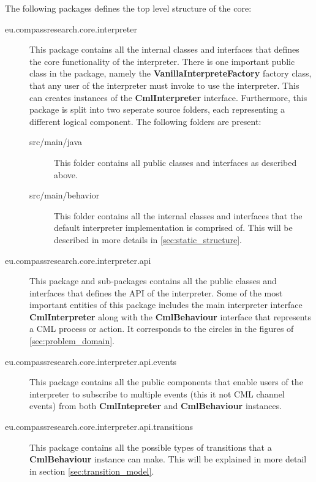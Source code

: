 \documentclass[a4paper, 10pt]{include/compassreport}   %
\begin{document}
The following packages defines the top level structure of the core:
\begin{description}

\item[eu.compassresearch.core.interpreter] This package contains all
  the internal classes and interfaces that defines the core
  functionality of the interpreter. There is one important public class
  in the package, namely the \textbf{VanillaInterpreteFactory} factory
  class, that any user of the interpreter must invoke to use the
  interpreter. This can creates instances of the \textbf{CmlInterpreter}
  interface. Furthermore, this package is split into two
  seperate source folders, each representing a different logical component. The
  following folders are present:
  \begin{description}
  \item[src/main/java] This folder contains all public classes and
    interfaces as described above.
  \item[src/main/behavior] This folder contains all the internal
    classes and interfaces that the default interpreter implementation is
    comprised of. This will be described in more details in
    \autoref{sec:static_structure}.
  \end{description}

\item[eu.compassresearch.core.interpreter.api] This package and
  sub-packages contains all the public classes and interfaces that
  defines the API of the interpreter. Some of the most important
  entities of this package includes the main interpreter interface
  \textbf{CmlInterpreter} along with the \textbf{CmlBehaviour} interface
  that represents a CML process or action. It corresponds to the circles
  in the figures of \autoref{sec:problem_domain}.

\item[eu.compassresearch.core.interpreter.api.events] This package
  contains all the public components that enable users of the
  interpreter to subscribe to multiple events (this it not CML
  channel events) from both \textbf{CmlIntepreter} and
  \textbf{CmlBehaviour} instances.

\item[eu.compassresearch.core.interpreter.api.transitions] This
  package contains all the possible types of transitions that a
  \textbf{CmlBehaviour} instance can make. This will be explained in
  more detail in section \ref{sec:transition_model}.


\end{description}
\end{document}
